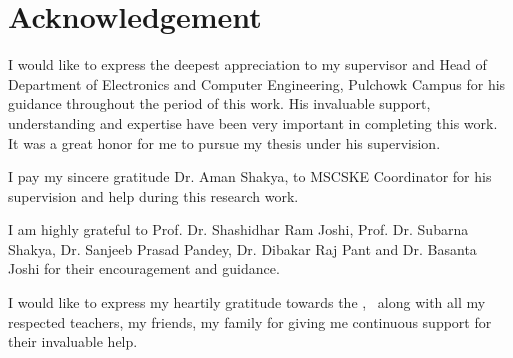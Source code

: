 \chapter*{Acknowledgement}


I would like to express the deepest appreciation to my supervisor and Head of Department of Electronics and Computer Engineering, Pulchowk Campus \myadvisorA for his guidance throughout the period of this work. His invaluable support, understanding and expertise have been very important in completing this work. It was a great honor for me to pursue my thesis under his supervision.

I pay my sincere gratitude Dr. Aman Shakya, to MSCSKE Coordinator for his supervision and help during this research work.

I am highly grateful to Prof. Dr. Shashidhar Ram Joshi, Prof. Dr. Subarna Shakya, Dr. Sanjeeb Prasad Pandey, Dr. Dibakar Raj Pant and Dr. Basanta Joshi for their encouragement and guidance.

I would like to express my heartily gratitude towards the \myinstitute, \mycampus ~along with all my respected teachers, my friends, my family for giving me continuous support for their invaluable help.


{\bf{\theauthor}}


{\bf{\roll}}


{\bf{\myinstitute}}


